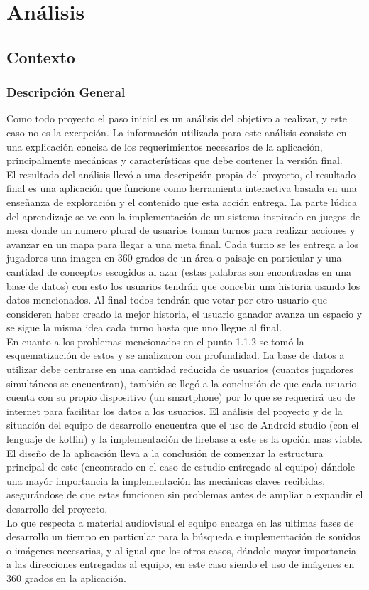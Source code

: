 \section{Análisis}

\subsection{Contexto}
\subsubsection{Descripción General}
Como todo proyecto el paso inicial es un análisis del objetivo a realizar, y este caso no es la excepción. La información utilizada para este análisis consiste en una explicación concisa de los requerimientos necesarios de la aplicación, principalmente mecánicas y características que debe contener la versión final.\\
El resultado del análisis llevó a una descripción propia del proyecto, el resultado final es una aplicación que funcione como herramienta interactiva basada en una enseñanza de exploración y el contenido que esta acción entrega. La parte lúdica del aprendizaje se ve con la implementación de un sistema inspirado en juegos de mesa donde un numero plural de usuarios toman turnos para realizar acciones y avanzar en un mapa para llegar a una meta final. Cada turno se les entrega a los jugadores una imagen en 360 grados de un área o paisaje en particular y una cantidad de conceptos escogidos al azar (estas palabras son encontradas en una base de datos) con esto los usuarios tendrán que concebir una historia usando los datos mencionados. Al final todos tendrán que votar por otro usuario que consideren haber creado la mejor historia, el usuario ganador avanza un espacio y se sigue la misma idea cada turno hasta que uno llegue al final.\\
En cuanto a los problemas mencionados en el punto 1.1.2 se tomó la esquematización de estos y se analizaron con profundidad. La base de datos a utilizar debe centrarse en una cantidad reducida de usuarios (cuantos jugadores simultáneos se encuentran), también se llegó a la conclusión de que cada usuario cuenta con su propio dispositivo (un smartphone) por lo que se requerirá uso de internet para facilitar los datos a los usuarios. El análisis del proyecto y de la situación del equipo de desarrollo encuentra que el uso de Android studio (con el lenguaje de kotlin) y la implementación de firebase a este es la opción mas viable.\\
El diseño de la aplicación lleva a la conclusión de comenzar la estructura principal de este (encontrado en el caso de estudio entregado al equipo) dándole una mayór importancia la implementación las mecánicas claves recibidas, asegurándose de que estas funcionen sin problemas antes de ampliar o expandir el desarrollo del proyecto.\\
Lo que respecta a material audiovisual el equipo encarga en las ultimas fases de desarrollo un tiempo en particular para la búsqueda e implementación de sonidos o imágenes necesarias, y al igual que los otros casos, dándole mayor importancia a las direcciones entregadas al equipo, en este caso siendo el uso de imágenes en 360 grados en la aplicación.

